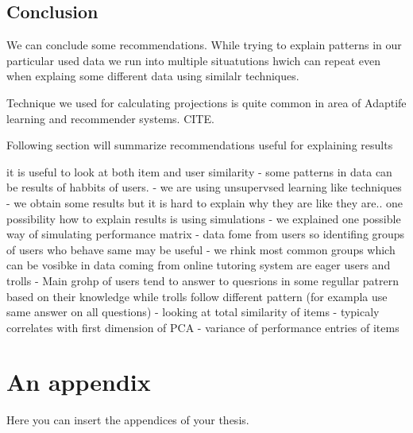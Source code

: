 \documentclass[
  digital, %
  table,   %
  nolof,     %
  nolot,     %
  nocover
]{fithesis3}
\begin{document}
\section{Conclusion}\label{conclusion}


We can conclude some recommendations. While trying to explain patterns
in our particular used data we run into multiple situatutions hwich can
repeat even when explaing some different data using similalr techniques.

Technique we used for calculating projections is quite common in area of
Adaptife learning and recommender systems. CITE.


Following section will summarize recommendations useful for explaining
results

it is useful to look at both item and user similarity - some
patterns in data can be results of habbits of users. - we are using
unsupervsed learning like techniques - we obtain some results but it is
hard to explain why they are like they are.. one possibility how to
explain results is using simulations - we explained one possible way of
simulating performance matrix - data fome from users so identifing
groups of users who behave same may be useful - we rhink most common
groups which can be vosibke in data coming from online tutoring system
are eager users and trolls - Main grohp of users tend to answer to
quesrions in some regullar patrern based on their knowledge while trolls
follow different pattern (for exampla use same answer on all questions)
- looking at total similarity of items - typicaly correlates with first
dimension of PCA - variance of performance entries of items




  \makeatletter\thesis@blocks@clear\makeatother
  \printindex

\appendix %
\chapter{An appendix}
Here you can insert the appendices of your thesis.
\end{document}
